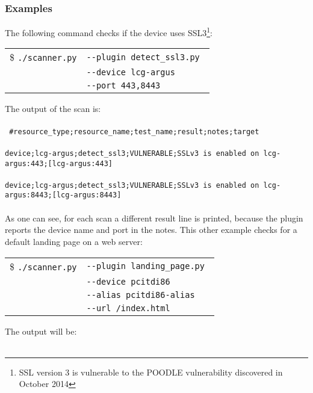 \subsubsection{Examples}
The following command checks if the device uses SSL3\footnote{SSL version 3 is vulnerable to the POODLE vulnerability discovered in October 2014}:
\begin{table}[H]

    \begin{tabular}{ c  l }


\$ \texttt{./scanner.py} & \texttt{-{}-plugin detect\_ssl3.py } \\
  & \texttt{-{}-device lcg-argus} \\
  & \texttt{-{}-port 443,8443}    	       
	\end{tabular}    

\end{table}
\noindent
The output of the scan is: 
\\
\\
\texttt{
\#resource\_type;resource\_name;test\_name;result;notes;target}
\\
\\
\texttt{device;lcg-argus;detect\_ssl3;VULNERABLE;SSLv3 is enabled on lcg-argus:443;[lcg-argus:443]}
\\
\\
\texttt{device;lcg-argus;detect\_ssl3;VULNERABLE;SSLv3 is enabled on lcg-argus:8443;[lcg-argus:8443]}
\\
\\
As one can see, for each scan a different result line is printed, because the plugin reports the device name and port in the notes. 
This other example checks for a default landing page on a web server:
\begin{table}[H]

    \begin{tabular}{ c  l }


\$ \texttt{./scanner.py} & \texttt{-{}-plugin landing\_page.py } \\
  & \texttt{-{}-device pcitdi86} \\
  & \texttt{-{}-alias pcitdi86-alias}\\    	       
    & \texttt{-{}-url /index.html}\\ 
	\end{tabular}    

\end{table}
\noindent
The output will be:
\\
\\
